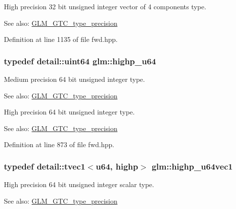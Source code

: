 High precision 32 bit unsigned integer vector of 4 components type. \begin{Desc}
\item[See also:]\hyperlink{group__gtc__type__precision}{GLM\_\-GTC\_\-type\_\-precision} \end{Desc}


Definition at line 1135 of file fwd.hpp.\hypertarget{group__gtc__type__precision_g6006ea883d3c0491791650b2fb84de39}{
\subsubsection[highp\_\-u64]{\setlength{\rightskip}{0pt plus 5cm}typedef detail::uint64 {\bf glm::highp\_\-u64}}}
\label{group__gtc__type__precision_g6006ea883d3c0491791650b2fb84de39}


Medium precision 64 bit unsigned integer type. \begin{Desc}
\item[See also:]\hyperlink{group__gtc__type__precision}{GLM\_\-GTC\_\-type\_\-precision}\end{Desc}
High precision 64 bit unsigned integer type. \begin{Desc}
\item[See also:]\hyperlink{group__gtc__type__precision}{GLM\_\-GTC\_\-type\_\-precision} \end{Desc}


Definition at line 873 of file fwd.hpp.\hypertarget{group__gtc__type__precision_gb48ca217e1d1cc9aac3d9f037493ae7e}{
\subsubsection[highp\_\-u64vec1]{\setlength{\rightskip}{0pt plus 5cm}typedef detail::tvec1$<$u64, highp$>$ {\bf glm::highp\_\-u64vec1}}}
\label{group__gtc__type__precision_gb48ca217e1d1cc9aac3d9f037493ae7e}


High precision 64 bit unsigned integer scalar type. \begin{Desc}
\item[See also:]\hyperlink{group__gtc__type__precision}{GLM\_\-GTC\_\-type\_\-precision} \end{Desc}


